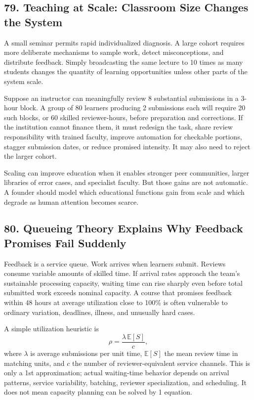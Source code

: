 \subsection*{79. Teaching at Scale: Classroom Size Changes the System}

A small seminar permits rapid individualized diagnosis. A large cohort requires more deliberate mechanisms to sample work, detect misconceptions, and distribute feedback. Simply broadcasting the same lecture to 10 times as many students changes the quantity of learning opportunities unless other parts of the system scale.

Suppose an instructor can meaningfully review 8 substantial submissions in a 3-hour block. A group of 80 learners producing 2 submissions each will require 20 such blocks, or 60 skilled reviewer-hours, before preparation and corrections. If the institution cannot finance them, it must redesign the task, share review responsibility with trained faculty, improve automation for checkable portions, stagger submission dates, or reduce promised intensity. It may also need to reject the larger cohort.

Scaling can improve education when it enables stronger peer communities, larger libraries of error cases, and specialist faculty. But those gains are not automatic. A founder should model which educational functions gain from scale and which degrade as human attention becomes scarce.

\subsection*{80. Queueing Theory Explains Why Feedback Promises Fail Suddenly}

Feedback is a service queue. Work arrives when learners submit. Reviews consume variable amounts of skilled time. If arrival rates approach the team's sustainable processing capacity, waiting time can rise sharply even before total submitted work exceeds nominal capacity. A course that promises feedback within 48 hours at average utilization close to 100\% is often vulnerable to ordinary variation, deadlines, illness, and unusually hard cases.

A simple utilization heuristic is
\begin{equation}
\rho = \frac{\lambda \, \mathbb{E}[S]}{c},
\end{equation}
where $\lambda$ is average submissions per unit time, $\mathbb{E}[S]$ the mean review time in matching units, and $c$ the number of reviewer-equivalent service channels. This is only a 1st approximation; actual waiting-time behavior depends on arrival patterns, service variability, batching, reviewer specialization, and scheduling. It does not mean capacity planning can be solved by 1 equation.

